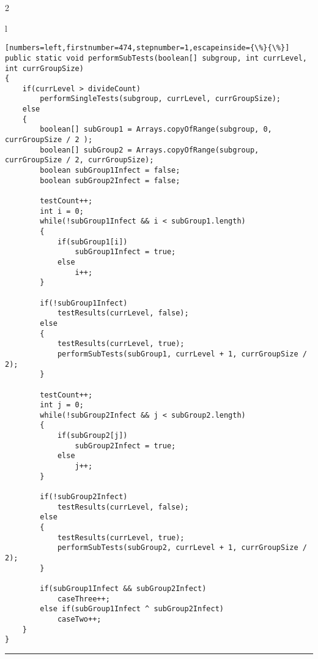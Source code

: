 \documentclass[letterpaper, 10pt,DIV=13]{scrartcl}
\numberwithin{equation}{section} %
\numberwithin{figure}{section} %
\numberwithin{table}{section} %
\begin{document}
2
\begin{center}
\begin{tabular}{l}
\begin{lstlisting}[numbers=left,firstnumber=474,stepnumber=1,escapeinside={\%}{\%}]
public static void performSubTests(boolean[] subgroup, int currLevel, int currGroupSize)
{
    if(currLevel > divideCount)
        performSingleTests(subgroup, currLevel, currGroupSize);
    else
    {
        boolean[] subGroup1 = Arrays.copyOfRange(subgroup, 0, currGroupSize / 2 );                      
        boolean[] subGroup2 = Arrays.copyOfRange(subgroup, currGroupSize / 2, currGroupSize);         
        boolean subGroup1Infect = false;
        boolean subGroup2Infect = false;

        testCount++;
        int i = 0;
        while(!subGroup1Infect && i < subGroup1.length)
        {
            if(subGroup1[i])
                subGroup1Infect = true;
            else
                i++;
        }

        if(!subGroup1Infect)
            testResults(currLevel, false);
        else
        {
            testResults(currLevel, true);
            performSubTests(subGroup1, currLevel + 1, currGroupSize / 2);
        }

        testCount++;
        int j = 0;
        while(!subGroup2Infect && j < subGroup2.length)
        {
            if(subGroup2[j])
                subGroup2Infect = true;
            else
                j++;
        }

        if(!subGroup2Infect)
            testResults(currLevel, false);
        else
        {
            testResults(currLevel, true);
            performSubTests(subGroup2, currLevel + 1, currGroupSize / 2);
        }

        if(subGroup1Infect && subGroup2Infect)
            caseThree++;
        else if(subGroup1Infect ^ subGroup2Infect)
            caseTwo++;
    }
}
\end{lstlisting}
\end{tabular}
\end{center}\textbf{}

\par\noindent\rule{\textwidth}{0.4pt}
\end{document}
